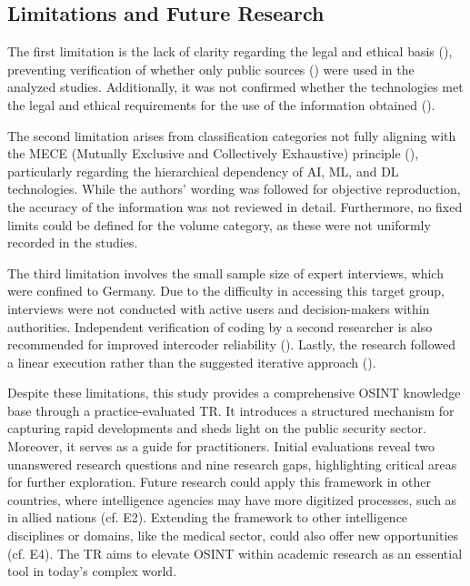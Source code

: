 \documentclass[10pt]{article}
\begin{document}
\subsection{Limitations and Future Research}

The first limitation is the lack of clarity regarding the legal and ethical basis (\cite{Ghioni.2023,Wittmer.2022}), preventing verification of whether only public sources (\cite{NorthAtlanticTreatyOrganization.2002}) were used in the analyzed studies. Additionally, it was not confirmed whether the technologies met the legal and ethical requirements for the use of the information obtained (\cite{PastorGalindo.2020,Wittmer.2022}).

The second limitation arises from classification categories not fully aligning with the MECE (Mutually Exclusive and Collectively Exhaustive) principle (\cite{Lee.2018}), particularly regarding the hierarchical dependency of AI, ML, and DL technologies. While the authors' wording was followed for objective reproduction, the accuracy of the information was not reviewed in detail. Furthermore, no fixed limits could be defined for the volume category, as these were not uniformly recorded in the studies.

The third limitation involves the small sample size of expert interviews, which were confined to Germany. Due to the difficulty in accessing this target group, interviews were not conducted with active users and decision-makers within authorities. Independent verification of coding by a second researcher is also recommended for improved intercoder reliability (\cite{Glaser.2009}). Lastly, the research followed a linear execution rather than the suggested iterative approach (\cite{Peffers.2007}).

Despite these limitations, this study provides a comprehensive OSINT knowledge base through a practice-evaluated TR. It introduces a structured mechanism for capturing rapid developments and sheds light on the public security sector. Moreover, it serves as a guide for practitioners. Initial evaluations reveal two unanswered research questions and nine research gaps, highlighting critical areas for further exploration. Future research could apply this framework in other countries, where intelligence agencies may have more digitized processes, such as in allied nations (cf. E2). Extending the framework to other intelligence disciplines or domains, like the medical sector, could also offer new opportunities (cf. E4). The TR aims to elevate OSINT within academic research as an essential tool in today’s complex world.
\end{document}
